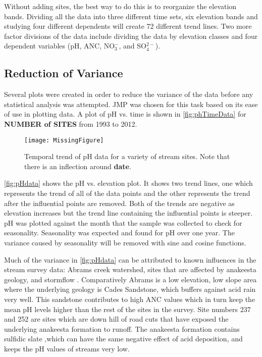 Without adding sites, the best way to do this is to reorganize the elevation bands. 
Dividing all the data into three different time sets, six elevation bands and studying four different dependents will create 72 different trend lines.
Two more factor divisions of the data include dividing the data by elevation classes and four dependent variables (pH, ANC, NO$_3^-$, and SO$_4^{2-}$). 

\subsection{Reduction of Variance}
\label{sec:TARedOfVar}
Several plots were created in order to reduce the variance of the data before any statistical analysis was attempted. 
JMP was chosen for this task based on its ease of use in plotting data. 
A plot of pH vs. time is shown in \autoref{fig:phTimeData} for \textbf{NUMBER of SITES} from 1993 to 2012.
\begin{figure}
	\centering
	  \texttt{[image: MissingFigure]}
	\caption{Temporal trend of pH data for a variety of stream sites.  Note that there is an inflection around \textbf{date}.}
	\label{fig:phTimeData}
\end{figure}
\autoref{fig:pHdata} shows the pH vs. elevation plot. 
It shows two trend lines, one which represents the trend of all of the data points and the other represents the trend after the influential points are removed. 
Both of the trends are negative as elevation increases but the trend line containing the influential points is steeper. pH was plotted against the month that the sample was collected to check for seasonality. 
Seasonality was expected and found for pH over one year. 
The variance caused by seasonality will be removed with sine and cosine functions.

Much of the variance in \autoref{fig:pHdata} can be attributed to known influences in the stream survey data: Abrams creek watershed, sites that are affected by anakeesta geology, and stormflow \citep{neff2012influence}.  
Comparatively Abrams is a low elevation, low slope area where the underlying geology is Cades Sandstone, which buffers against acid rain very well. 
This sandstone contributes to high ANC values which in turn keep the mean pH levels higher than the rest of the sites in the survey. Site numbers 237 and 252 are sites which are down hill of road cuts that have exposed the underlying anakeesta formation to runoff.  
The anakeesta formation contains sulfidic slate ,which can have the same negative effect of acid deposition,  and keeps the pH values of streams very low.


